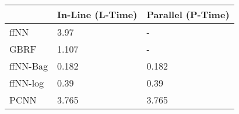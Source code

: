 \begin{tabular}{lll}
\toprule
{} & In-Line (L-Time) & Parallel (P-Time) \\
\midrule
ffNN     &             3.97 &                 - \\
GBRF     &            1.107 &                 - \\
ffNN-Bag &            0.182 &             0.182 \\
ffNN-log &             0.39 &              0.39 \\
PCNN     &            3.765 &             3.765 \\
\bottomrule
\end{tabular}
